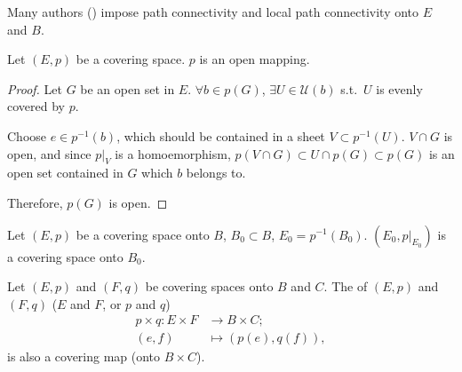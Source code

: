 \documentclass[openany, oneside, a5paper]{book}
\begin{document}
Many authors (\cite{基础拓扑学讲义}) impose path connectivity and local path connectivity onto $E$ and $B$.

\begin{theorem}
    Let $(E, p)$ be a covering space.
    $p$ is an open mapping.
\end{theorem}
\begin{proof}
    Let $G$ be an open set in $E$.
    $\forall b \in p(G)$, $\exists U \in \mathscr U(b)$ s.t.\ $U$ is evenly covered by $p$.

    Choose $e \in p^{-1}(b)$, which should be contained in a sheet $V \subset p^{-1}(U)$.
    $V \cap G$ is open, and since $p|_V$ is a homoemorphism, $p(V \cap G) \subset U \cap p(G) \subset p(G)$ is an open set contained in $G$ which $b$ belongs to.

    Therefore, $p(G)$ is open.
\end{proof}

\begin{theorem}
    Let $(E, p)$ be a covering space onto $B$, $B_0 \subset B$, $E_0 = p^{-1}(B_0)$.
    $(E_0, p |_{E_0})$ is a covering space onto $B_0$.
\end{theorem}

\begin{theorem}
    Let $(E, p)$ and $(F, q)$ be covering spaces onto $B$ and $C$.
    The  of $(E, p)$ and $(F, q)$ ($E$ and $F$, or $p$ and $q$)
    \begin{align*}
        p \times q \colon
         E \times F &\to B \times C;
         \\
         (e, f) &\mapsto (p(e), q(f)),
    \end{align*}
    is also a covering map (onto $B \times C$).
\end{theorem}



\backmatter{}
\nocite{*} %
\printbibliography[heading=bibliography, title={bibliography}]

\printindex[symbol]

\printindex
\end{document}
